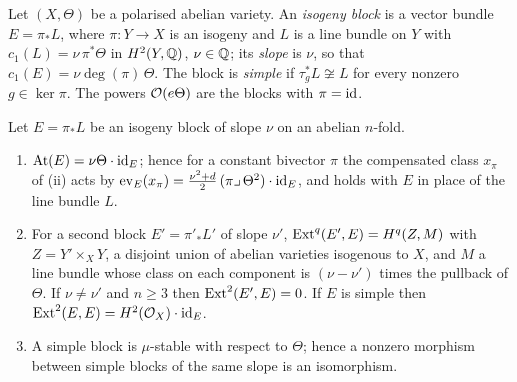 \begin{definition}\label{def:block}
Let $(X,\Theta)$ be a polarised abelian variety. An \emph{isogeny block} is a
vector bundle $E=\pi_{*}L$, where $\pi\colon Y\to X$ is an isogeny and $L$ is
a line bundle on $Y$ with $c_{1}(L)=\nu\,\pi^{*}\Theta$ in $H^{2}(Y,\mathbb{Q})$,
$\nu\in\mathbb{Q}$; its \emph{slope} is $\nu$, so that $c_{1}(E)=\nu\deg(\pi)\,\Theta$.
The block is \emph{simple} if $\tau_{g}^{*}L\not\cong L$ for every nonzero
$g\in\ker\pi$. The powers $\mathcal{O}(e\Theta)$ are the blocks with $\pi=\operatorname{id}$.
\end{definition}

\begin{lemma}\label{lem:blocks}
Let $E=\pi_{*}L$ be an isogeny block of slope $\nu$ on an abelian $n$-fold.
\begin{enumerate}[label=\textup{(\roman*)},nosep]
\item $\mathrm{At}(E)=\nu\Theta\cdot\operatorname{id}_{E}$; hence for a constant bivector
  $\pi$ the compensated class $x_{\pi}$ of (ii) acts by
  $\operatorname{ev}_{E}(x_{\pi})=\tfrac{\nu^{2}+d}{2}\,(\pi\lrcorner\,\Theta^{2})\cdot\operatorname{id}_{E}$,
  and  holds with $E$ in place of the line bundle $L$.
\item For a second block $E'=\pi'_{*}L'$ of slope $\nu'$,
  $\operatorname{Ext}^{q}(E',E)=H^{q}(Z,M)$ with $Z=Y'\times_{X}Y$, a disjoint union of
  abelian varieties isogenous to $X$, and $M$ a line bundle whose class on
  each component is $(\nu-\nu')$ times the pullback of $\Theta$. If
  $\nu\ne\nu'$ and $n\ge3$ then $\operatorname{Ext}^{2}(E',E)=0$. If $E$ is simple then
  $\operatorname{Ext}^{2}(E,E)=H^{2}(\mathcal{O}_{X})\cdot\operatorname{id}_{E}$.
\item A simple block is $\mu$-stable with respect to $\Theta$; hence a
  nonzero morphism between simple blocks of the same slope is an
  isomorphism.
\end{enumerate}
\end{lemma}

